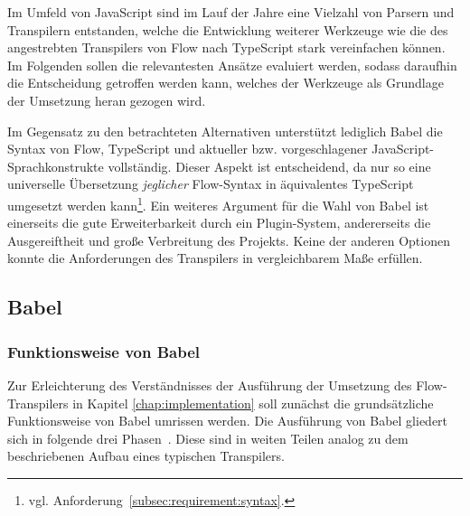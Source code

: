 
Im Umfeld von JavaScript sind im Lauf der Jahre eine Vielzahl von Parsern und Transpilern entstanden, welche die Entwicklung weiterer Werkzeuge wie die des angestrebten Transpilers von Flow nach TypeScript stark vereinfachen können. Im Folgenden sollen die relevantesten Ansätze evaluiert werden, sodass daraufhin die Entscheidung getroffen werden kann, welches der Werkzeuge als Grundlage der Umsetzung heran gezogen wird.




Im Gegensatz zu den betrachteten Alternativen unterstützt lediglich Babel die Syntax von Flow, TypeScript und aktueller bzw. vorgeschlagener JavaScript-Sprachkonstrukte vollständig. Dieser Aspekt ist entscheidend, da nur so eine universelle Übersetzung \emph{jeglicher} Flow-Syntax in äquivalentes TypeScript umgesetzt werden kann\footnote{vgl. Anforderung~\ref{subsec:requirement:syntax}.}.
Ein weiteres Argument für die Wahl von Babel ist einerseits die gute Erweiterbarkeit durch ein Plugin-System, andererseits die Ausgereiftheit und große Verbreitung des Projekts. Keine der anderen Optionen konnte die Anforderungen des Transpilers in vergleichbarem Maße erfüllen.

\subsection{Babel}
\label{sec:babel}

\subsubsection{Funktionsweise von Babel}

Zur Erleichterung des Verständnisses der Ausführung der Umsetzung des Flow-Transpilers in Kapitel \ref{chap:implementation} soll zunächst die grundsätzliche Funktionsweise von Babel umrissen werden. Die Ausführung von Babel gliedert sich in folgende drei Phasen~\autocite{BABEL:HANDBOOK}. Diese sind in weiten Teilen analog zu dem beschriebenen Aufbau eines typischen Transpilers.

